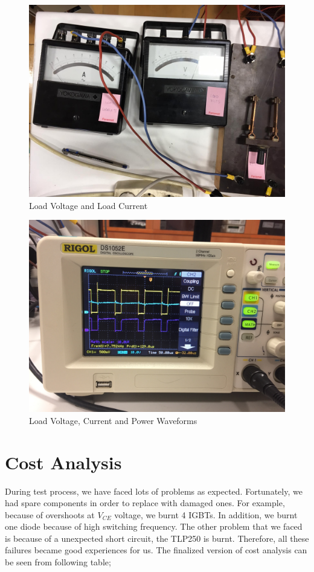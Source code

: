 \documentclass{article}
\begin{document}
\begin{figure}[H]
\centering
\includegraphics[scale=0.1]{demovoltagecurrent2.jpg}
\caption{Load Voltage and Load Current}
\label{fig:members}
\end{figure}

\begin{figure}[H]
\centering
\includegraphics[scale=0.05]{demovoltagecurrent}
\caption{Load Voltage, Current and Power Waveforms }
\label{fig:members}
\end{figure}

\section{Cost Analysis}
During test process, we have faced lots of problems as expected. Fortunately, we had spare components in order to replace with damaged ones. For example, because of overshoots at \(V_{CE}\) voltage, we burnt 4 IGBTs. In addition, we burnt one diode because of high switching frequency. The other problem that we faced is because of a unexpected short circuit, the TLP250 is burnt. Therefore, all these failures became good experiences for us. The finalized version of cost analysis can be seen from following table;
\end{document}
